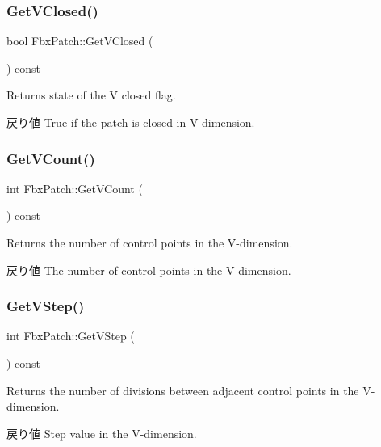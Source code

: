 \subsubsection{\texorpdfstring{Get\+V\+Closed()}{GetVClosed()}}
{\footnotesize\ttfamily bool Fbx\+Patch\+::\+Get\+V\+Closed (\begin{DoxyParamCaption}{ }\end{DoxyParamCaption}) const}

Returns state of the V closed flag. \begin{DoxyReturn}{戻り値}
{\ttfamily True} if the patch is closed in V dimension. 
\end{DoxyReturn}
\mbox{\label{class_fbx_patch_ad2c56fe0035f645367c4184c8c051044}} 
\subsubsection{\texorpdfstring{Get\+V\+Count()}{GetVCount()}}
{\footnotesize\ttfamily int Fbx\+Patch\+::\+Get\+V\+Count (\begin{DoxyParamCaption}{ }\end{DoxyParamCaption}) const}

Returns the number of control points in the V-\/dimension. \begin{DoxyReturn}{戻り値}
The number of control points in the V-\/dimension. 
\end{DoxyReturn}
\mbox{\label{class_fbx_patch_a71e7d7a25b3cfc9fad3ffd8835b6337e}} 
\subsubsection{\texorpdfstring{Get\+V\+Step()}{GetVStep()}}
{\footnotesize\ttfamily int Fbx\+Patch\+::\+Get\+V\+Step (\begin{DoxyParamCaption}{ }\end{DoxyParamCaption}) const}

Returns the number of divisions between adjacent control points in the V-\/dimension. \begin{DoxyReturn}{戻り値}
Step value in the V-\/dimension. 
\end{DoxyReturn}
\mbox{\label{class_fbx_patch_a5dea472db8e81e1f249120a9c2d86277}} 
